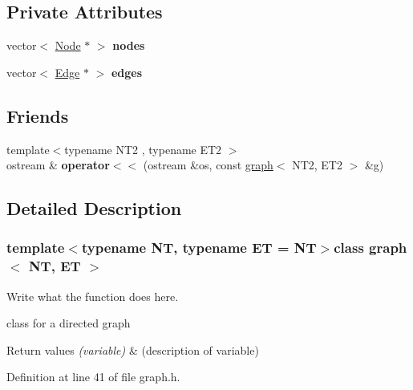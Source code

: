 \subsection*{Private Attributes}
\begin{DoxyCompactItemize}
\item 
\hypertarget{classgraph_ac106879f6e370243b2413de2a0504da4}{vector$<$ \hyperlink{structgraph_1_1Node}{Node} $\ast$ $>$ {\bfseries nodes}}\label{classgraph_ac106879f6e370243b2413de2a0504da4}

\item 
\hypertarget{classgraph_a52ef68305fa541a124199c0e6283b46d}{vector$<$ \hyperlink{structgraph_1_1Edge}{Edge} $\ast$ $>$ {\bfseries edges}}\label{classgraph_a52ef68305fa541a124199c0e6283b46d}

\end{DoxyCompactItemize}
\subsection*{Friends}
\begin{DoxyCompactItemize}
\item 
\hypertarget{classgraph_a3f17ad3ab403d6cde1e4d08908bcdb52}{{\footnotesize template$<$typename N\+T2 , typename E\+T2 $>$ }\\ostream \& {\bfseries operator$<$$<$} (ostream \&os, const \hyperlink{classgraph}{graph}$<$ N\+T2, E\+T2 $>$ \&g)}\label{classgraph_a3f17ad3ab403d6cde1e4d08908bcdb52}

\end{DoxyCompactItemize}


\subsection{Detailed Description}
\subsubsection*{template$<$typename N\+T, typename E\+T = N\+T$>$class graph$<$ N\+T, E\+T $>$}

Write what the function does here. 

class for a directed graph 
\begin{DoxyRetVals}{Return values}
{\em (variable)} & (description of variable) \\
\hline
\end{DoxyRetVals}


Definition at line 41 of file graph.\+h.



